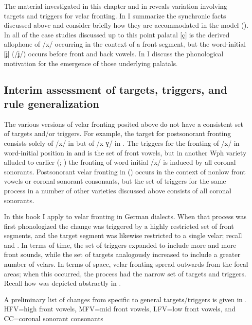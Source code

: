 The material investigated in this chapter and in  reveals variation involving targets and triggers for velar fronting. In  I summarize the synchronic facts discussed above and consider briefly how they are accommodated in the  model (). In all of the case studies discussed up to this point palatal [ç] is the derived allophone of /x/ occurring in the context of a front segment, but the word-initial  [ʝ] (/ʝ/) occurs before front and back vowels. In  I discuss the phonological motivation for the emergence of those underlying palatals.

\subsection{Interim assessment of targets, triggers, and rule generalization}\label{sec:4.5.1}

The various versions of velar fronting posited above do not have a consistent set of targets and/or triggers. For example, the target for postsonorant fronting consists solely of /x/ in  but of /x ɣ/ in . The triggers for the fronting of /x/ in word-initial position in  and  is the set of front vowels, but in another Wph variety alluded to earlier (; \citealt{Arens1908}) the fronting of word-initial /x/ is induced by all coronal sonorants. Postsonorant velar fronting in  () occurs in the context of nonlow front vowels or coronal sonorant consonants, but the set of triggers for the same process in a number of other varieties discussed above consists of all coronal sonorants.

In this book I apply  to velar fronting in German dialects. When that process was first phonologized the change was triggered by a highly restricted set of front segments, and the target segment was likewise restricted to a single velar; recall  and . In terms of time, the set of triggers expanded to include more and more front sounds, while the set of targets analogously increased to include a greater number of velars. In terms of space, velar fronting spread outwards from the focal areas; when this occurred, the process had the narrow set of targets and triggers. Recall how  was depicted abstractly in .

A preliminary list of changes from specific to general targets/triggers is given in . HFV=high front vowels, MFV=mid front vowels, LFV=low front vowels, and CC=coronal sonorant consonants

